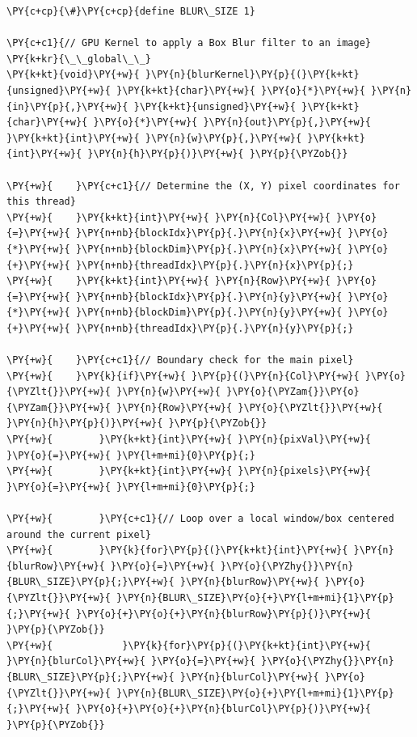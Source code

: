 \begin{Verbatim}[label=\makebox{\url{https://github.com/lucabaldini/cmepda/tree/master/slides/latex/snippets/cuda_box_blur.cu}},commandchars=\\\{\}]
\PY{c+cp}{\#}\PY{c+cp}{define BLUR\_SIZE 1}

\PY{c+c1}{// GPU Kernel to apply a Box Blur filter to an image}
\PY{k+kr}{\_\_global\_\_}
\PY{k+kt}{void}\PY{+w}{ }\PY{n}{blurKernel}\PY{p}{(}\PY{k+kt}{unsigned}\PY{+w}{ }\PY{k+kt}{char}\PY{+w}{ }\PY{o}{*}\PY{+w}{ }\PY{n}{in}\PY{p}{,}\PY{+w}{ }\PY{k+kt}{unsigned}\PY{+w}{ }\PY{k+kt}{char}\PY{+w}{ }\PY{o}{*}\PY{+w}{ }\PY{n}{out}\PY{p}{,}\PY{+w}{ }\PY{k+kt}{int}\PY{+w}{ }\PY{n}{w}\PY{p}{,}\PY{+w}{ }\PY{k+kt}{int}\PY{+w}{ }\PY{n}{h}\PY{p}{)}\PY{+w}{ }\PY{p}{\PYZob{}}

\PY{+w}{    }\PY{c+c1}{// Determine the (X, Y) pixel coordinates for this thread}
\PY{+w}{    }\PY{k+kt}{int}\PY{+w}{ }\PY{n}{Col}\PY{+w}{ }\PY{o}{=}\PY{+w}{ }\PY{n+nb}{blockIdx}\PY{p}{.}\PY{n}{x}\PY{+w}{ }\PY{o}{*}\PY{+w}{ }\PY{n+nb}{blockDim}\PY{p}{.}\PY{n}{x}\PY{+w}{ }\PY{o}{+}\PY{+w}{ }\PY{n+nb}{threadIdx}\PY{p}{.}\PY{n}{x}\PY{p}{;}
\PY{+w}{    }\PY{k+kt}{int}\PY{+w}{ }\PY{n}{Row}\PY{+w}{ }\PY{o}{=}\PY{+w}{ }\PY{n+nb}{blockIdx}\PY{p}{.}\PY{n}{y}\PY{+w}{ }\PY{o}{*}\PY{+w}{ }\PY{n+nb}{blockDim}\PY{p}{.}\PY{n}{y}\PY{+w}{ }\PY{o}{+}\PY{+w}{ }\PY{n+nb}{threadIdx}\PY{p}{.}\PY{n}{y}\PY{p}{;}

\PY{+w}{    }\PY{c+c1}{// Boundary check for the main pixel}
\PY{+w}{    }\PY{k}{if}\PY{+w}{ }\PY{p}{(}\PY{n}{Col}\PY{+w}{ }\PY{o}{\PYZlt{}}\PY{+w}{ }\PY{n}{w}\PY{+w}{ }\PY{o}{\PYZam{}}\PY{o}{\PYZam{}}\PY{+w}{ }\PY{n}{Row}\PY{+w}{ }\PY{o}{\PYZlt{}}\PY{+w}{ }\PY{n}{h}\PY{p}{)}\PY{+w}{ }\PY{p}{\PYZob{}}
\PY{+w}{        }\PY{k+kt}{int}\PY{+w}{ }\PY{n}{pixVal}\PY{+w}{ }\PY{o}{=}\PY{+w}{ }\PY{l+m+mi}{0}\PY{p}{;}
\PY{+w}{        }\PY{k+kt}{int}\PY{+w}{ }\PY{n}{pixels}\PY{+w}{ }\PY{o}{=}\PY{+w}{ }\PY{l+m+mi}{0}\PY{p}{;}

\PY{+w}{        }\PY{c+c1}{// Loop over a local window/box centered around the current pixel}
\PY{+w}{        }\PY{k}{for}\PY{p}{(}\PY{k+kt}{int}\PY{+w}{ }\PY{n}{blurRow}\PY{+w}{ }\PY{o}{=}\PY{+w}{ }\PY{o}{\PYZhy{}}\PY{n}{BLUR\_SIZE}\PY{p}{;}\PY{+w}{ }\PY{n}{blurRow}\PY{+w}{ }\PY{o}{\PYZlt{}}\PY{+w}{ }\PY{n}{BLUR\_SIZE}\PY{o}{+}\PY{l+m+mi}{1}\PY{p}{;}\PY{+w}{ }\PY{o}{+}\PY{o}{+}\PY{n}{blurRow}\PY{p}{)}\PY{+w}{ }\PY{p}{\PYZob{}}
\PY{+w}{            }\PY{k}{for}\PY{p}{(}\PY{k+kt}{int}\PY{+w}{ }\PY{n}{blurCol}\PY{+w}{ }\PY{o}{=}\PY{+w}{ }\PY{o}{\PYZhy{}}\PY{n}{BLUR\_SIZE}\PY{p}{;}\PY{+w}{ }\PY{n}{blurCol}\PY{+w}{ }\PY{o}{\PYZlt{}}\PY{+w}{ }\PY{n}{BLUR\_SIZE}\PY{o}{+}\PY{l+m+mi}{1}\PY{p}{;}\PY{+w}{ }\PY{o}{+}\PY{o}{+}\PY{n}{blurCol}\PY{p}{)}\PY{+w}{ }\PY{p}{\PYZob{}}


\end{Verbatim}
